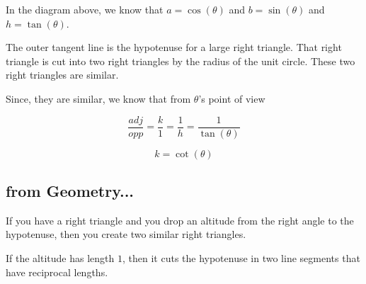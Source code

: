 \documentclass{ximera}
\begin{document}
\begin{image}
\end{image}



In the diagram above, we know that $a = \cos(\theta)$ and $b = \sin(\theta)$ and $h = \tan(\theta)$.


The outer tangent line is the hypotenuse for a large right triangle.  That right triangle is cut into two right triangles by the radius of the unit circle.  These two right triangles are similar.






Since, they are similar, we know that from $\theta$'s point of view


\[    \frac{adj}{opp} = \frac{k}{1}   = \frac{1}{h}     = \frac{1}{\tan(\theta)}       \]


\[         k = \cot(\theta)\]










\subsection{\textbf{\textcolor{blue!55!black}{from Geometry...}}}


If you have a right triangle and you drop an altitude from the right angle to the hypotenuse, then you create two similar right triangles.

If the altitude has length $1$, then it cuts the hypotenuse in two line segments that have reciprocal lengths.
\end{document}
